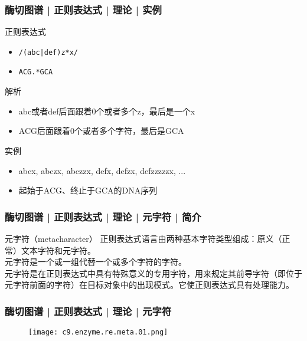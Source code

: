 \begin{frame}[fragile]
  \frametitle{酶切图谱 | 正则表达式 | 理论 | \alert{实例}}
  \begin{block}{正则表达式}
    \begin{itemize}
      \item<1-> \verb=/(abc|def)z*x/=
      \item<3-> \verb=ACG.*GCA=
    \end{itemize}
  \end{block}
  \begin{block}{解析}
    \begin{itemize}
      \item<2-> abc或者def后面跟着0个或者多个z，最后是一个x
      \item<4-> ACG后面跟着0个或者多个字符，最后是GCA
    \end{itemize}
  \end{block}
  \begin{block}{实例}
    \begin{itemize}
      \item<2-> abcx, abczx, abczzx, defx, defzx, defzzzzzx, ...
      \item<4-> 起始于ACG、终止于GCA的DNA序列
    \end{itemize}
  \end{block}
\end{frame}

\begin{frame}
  \frametitle{酶切图谱 | 正则表达式 | 理论 | 元字符 | 简介}
  \begin{block}{元字符（metacharacter）}
    正则表达式语言由两种基本字符类型组成：原义（正常）文本字符和元字符。\\
    \vspace{1em}
    \alert{元字符是一个或一组代替一个或多个字符的字符。}\\
    \vspace{1em}
    元字符是在正则表达式中具有特殊意义的专用字符，用来规定其前导字符（即位于元字符前面的字符）在目标对象中的出现模式。它使正则表达式具有处理能力。
  \end{block}
\end{frame}

\begin{frame}
  \frametitle{酶切图谱 | 正则表达式 | 理论 | \alert{元字符}}
  \begin{figure}
    \centering
    \texttt{[image: c9.enzyme.re.meta.01.png]}
  \end{figure}
\end{frame}

